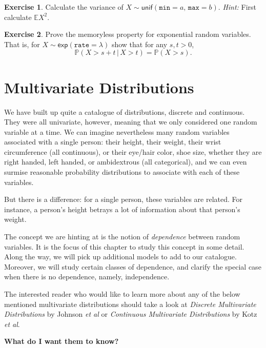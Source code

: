 \documentclass[]{book}
\numberwithin{equation}{chapter}
\numberwithin{figure}{chapter}
\theoremstyle{plain}
\theoremstyle{definition}
\newtheorem{xca}{Exercise}[chapter]
\theoremstyle{remark}
\theoremstyle{definition}
\theoremstyle{definition}
\theoremstyle{remark}
\begin{document}
\bigskip

\begin{xca}
Calculate the variance of
\(X\sim\mathsf{unif}(\mathtt{min}=a,\,\mathtt{max}=b)\). \emph{Hint:}
First calculate \(\mathbb{E} X^{2}\).
\end{xca}

\bigskip

\begin{xca}
Prove the memoryless property for exponential random variables. That is,
for \(X \sim \mathsf{exp}(\mathtt{rate} = \lambda)\) show that for any
\(s,t > 0\),
\[ \mathbb{P}(X > s + t\,|\, X > t) = \mathbb{P}(X > s).  \]
\end{xca}

\chapter{Multivariate
Distributions}\label{cha-multivariable-distributions}

We have built up quite a catalogue of distributions, discrete and
continuous. They were all univariate, however, meaning that we only
considered one random variable at a time. We can imagine nevertheless
many random variables associated with a single person: their height,
their weight, their wrist circumference (all continuous), or their
eye/hair color, shoe size, whether they are right handed, left handed,
or ambidextrous (all categorical), and we can even surmise reasonable
probability distributions to associate with each of these variables.

But there is a difference: for a single person, these variables are
related. For instance, a person's height betrays a lot of information
about that person's weight.

The concept we are hinting at is the notion of \emph{dependence} between
random variables. It is the focus of this chapter to study this concept
in some detail. Along the way, we will pick up additional models to add
to our catalogue. Moreover, we will study certain classes of dependence,
and clarify the special case when there is no dependence, namely,
independence.

The interested reader who would like to learn more about any of the
below mentioned multivariate distributions should take a look at
\emph{Discrete Multivariate Distributions} by Johnson \emph{et al}
\autocite{Johnson1997} or \emph{Continuous Multivariate Distributions}
\autocite{Kotz2000} by Kotz \emph{et al}.

\textbf{What do I want them to know?}
\end{document}
